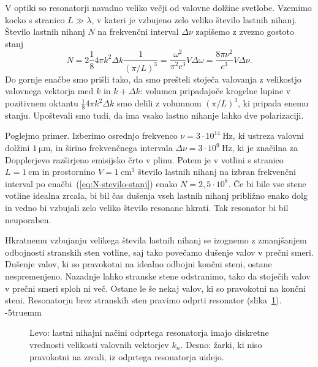V optiki so resonatorji navadno veliko večji
od valovne dolžine svetlobe. Vzemimo kocko s stranico $L\gg \lambda$, 
v kateri je vzbujeno zelo veliko število lastnih nihanj. Število lastnih nihanj $N$ 
na frekvenčni interval $\Delta \nu$ zapišemo z zvezno gostoto stanj
\begin{equation}
N=2 \frac{1}{8} 4\pi k^{2}\Delta k \frac{1}{(\pi/L)^3}=\frac{\omega^{2}}{\pi^{2}c^{3}}V\Delta\omega=
\frac{8\pi \nu^{2}}{c^{3}}V\Delta\nu.
\label{eq:N-stevilo-stanj}
\end{equation}
Do gornje enačbe smo prišli tako, da smo prešteli stoječa valovanja z velikostjo
valovnega vektorja med $k$ in $k+\Delta k$: volumen pripadajoče krogelne lupine v pozitivnem oktantu
$\frac{1}{8} 4\pi k^{2}\Delta k$ smo delili z volumnom $(\pi/L)^3$, ki pripada enemu stanju. 
Upoštevali smo tudi, da ima vsako lastno nihanje lahko dve polarizaciji.

Poglejmo primer. Izberimo osrednjo frekvenco $\nu=3\cdot10^{14}~\si{\hertz}$, ki
ustreza valovni dolžini $1~\si{\micro\metre}$, in širino frekvenčnega
intervala $\Delta\nu=3\cdot10^{9}~\si{\hertz}$, ki je značilna za Dopplerjevo
razširjeno emisijsko črto v plinu. 
Potem je v votlini s stranico $L=1~\si{\centi\metre}$ 
in prostornino $V=1~\si{\centi\metre^3}$ število lastnih nihanj na izbran frekvenčni interval 
po enačbi~(\ref{eq:N-stevilo-stanj}) enako
$N=2,5\cdot10^{8}$. Če bi bile vse stene votline idealna zrcala,
bi bil čas dušenja vseh lastnih nihanj približno enako dolg in vedno bi vzbujali
zelo veliko število resonanc hkrati. Tak resonator bi bil neuporaben.

Hkratnemu vzbujanju velikega števila lastnih nihanj se izognemo z zmanjšanjem odbojnosti
stranskih sten votline, saj tako povečamo dušenje valov v prečni smeri.
Dušenje valov, ki so pravokotni na idealno odbojni končni steni, ostane nespremenjeno.
Nazadnje lahko stranske stene odstranimo, tako da stoječih valov v prečni smeri
sploh ni več. Ostane le še nekaj valov, ki so pravokotni na končni
steni. Resonatorju brez stranskih sten  pravimo odprti resonator 
(slika~\ref{fig:Odprt_resonator}).
\vglue-5truemm
\begin{figure}[h]
\centering
\def\svgwidth{120truemm} 

\caption{Levo: lastni nihajni načini odprtega resonatorja imajo 
diskretne vrednosti velikosti valovnih vektorjev $k_{n}$. Desno: žarki, ki niso pravokotni na zrcali, 
iz odprtega resonatorja uidejo.}
\label{fig:Odprt_resonator}
\end{figure}

